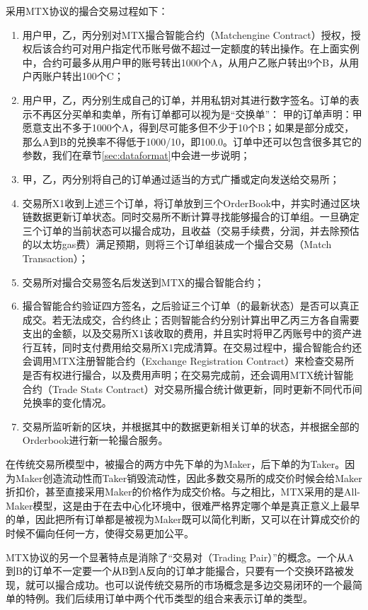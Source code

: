 \documentclass[UTF8,nofonts]{ctexart}
\begin{document}
采用MTX协议的撮合交易过程如下：

\begin{enumerate}
	\item 用户甲，乙，丙分别对MTX撮合智能合约（Matchengine Contract）授权，授权后该合约可对用户指定代币账号做不超过一定额度的转出操作。在上面实例中，合约可最多从用户甲的账号转出1000个A，从用户乙账户转出9个B，从用户丙账户转出100个C；
	\item 用户甲，乙，丙分别生成自己的订单，并用私钥对其进行数字签名。订单的表示不再区分买单和卖单，所有订单都可以视为是“交换单”： 甲的订单声明：甲愿意支出不多于1000个A，得到尽可能多但不少于10个B；如果是部分成交，那么A到B的兑换率不得低于1000/10，即100.0。订单中还可以包含很多其它的参数，我们在章节\ref{sec:dataformat}中会进一步说明；
	\item 甲，乙，丙分别将自己的订单通过适当的方式广播或定向发送给交易所；
	\item 交易所X1收到上述三个订单，将订单放到三个OrderBook中，并实时通过区块链数据更新订单状态。同时交易所不断计算寻找能够撮合的订单组。一旦确定三个订单的当前状态可以撮合成功，且收益（交易手续费，分润，并去除预估的以太坊gas费）满足预期，则将三个订单组装成一个撮合交易（Match Transaction）；
	\item 交易所对撮合交易签名后发送到MTX的撮合智能合约；
	\item 撮合智能合约验证四方签名，之后验证三个订单（的最新状态）是否可以真正成交。若无法成交，合约终止；否则智能合约分别计算出甲乙丙三方各自需要支出的金额，以及交易所X1该收取的费用，并且实时将甲乙丙账号中的资产进行互转，同时支付费用给交易所X1完成清算。在交易过程中，撮合智能合约还会调用MTX注册智能合约（Exchange Registration Contract）来检查交易所是否有权进行撮合，以及费用声明；在交易完成前，还会调用MTX统计智能合约（Trade Stats Contract）对交易所撮合统计做更新，同时更新不同代币间兑换率的变化情况。
	\item 交易所监听新的区块，并根据其中的数据更新相关订单的状态，并根据全部的Orderbook进行新一轮撮合服务。
\end{enumerate}

在传统交易所模型中，被撮合的两方中先下单的为Maker，后下单的为Taker。因为Maker创造流动性而Taker销毁流动性，因此多数交易所的成交价时候会给Maker折扣价，甚至直接采用Maker的价格作为成交价格。与之相比，MTX采用的是All-Maker模型，这是由于在去中心化环境中，很难严格界定哪个单是真正意义上最早的单，因此把所有订单都是被视为Maker既可以简化判断，又可以在计算成交价的时候不偏向任何一方，使得交易更加公平。

MTX协议的另一个显著特点是消除了“交易对（Trading Pair）”的概念。一个从A到B的订单不一定要一个从B到A反向的订单才能撮合，只要有一个交换环路被发现，就可以撮合成功。也可以说传统交易所的市场概念是多边交易闭环的一个最简单的特例。我们后续用订单中两个代币类型的组合来表示订单的类型。
\end{document}
